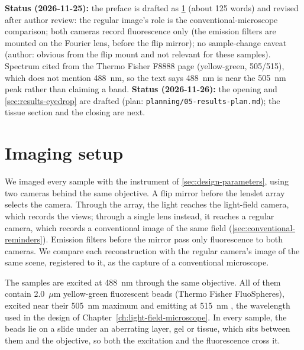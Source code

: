 {\textbf{Status (2026-11-25):} the preface is drafted as \cref{sec:imaging-setup} (about 125 words) and revised after author review: the regular image's role is the conventional-microscope comparison; both cameras record fluorescence only (the emission filters are mounted on the Fourier lens, before the flip mirror); no sample-change caveat (author: obvious from the flip mount and not relevant for these samples). Spectrum cited from the Thermo Fisher F8888 page (yellow-green, 505/515), which does not mention 488~nm, so the text says 488~nm is near the 505~nm peak rather than claiming a band. \textbf{Status (2026-11-26):} the opening and \cref{sec:results-eyedrop} are drafted (plan: \texttt{planning/05-results-plan.md}); the tissue section and the closing are next.}

\section{Imaging setup}
\label{sec:imaging-setup}

We imaged every sample with the instrument of \cref{sec:design-parameters}, using two cameras behind the same objective. A flip mirror before the lenslet array selects the camera. Through the array, the light reaches the light-field camera, which records the views; through a single lens instead, it reaches a regular camera, which records a conventional image of the same field (\cref{sec:conventional-reminders}). Emission filters before the mirror pass only fluorescence to both cameras. We compare each reconstruction with the regular camera's image of the same scene, registered to it, as the capture of a conventional microscope.

The samples are excited at 488~nm through the same objective. All of them contain 2.0~$\mu$m yellow-green fluorescent beads (Thermo Fisher FluoSpheres), excited near their 505~nm maximum and emitting at 515~nm \cite{thermofisher2026fluospheresYellowGreen}, the wavelength used in the design of Chapter~\ref{ch:light-field-microscope}. In every sample, the beads lie on a slide under an aberrating layer, gel or tissue, which sits between them and the objective, so both the excitation and the fluorescence cross it.



